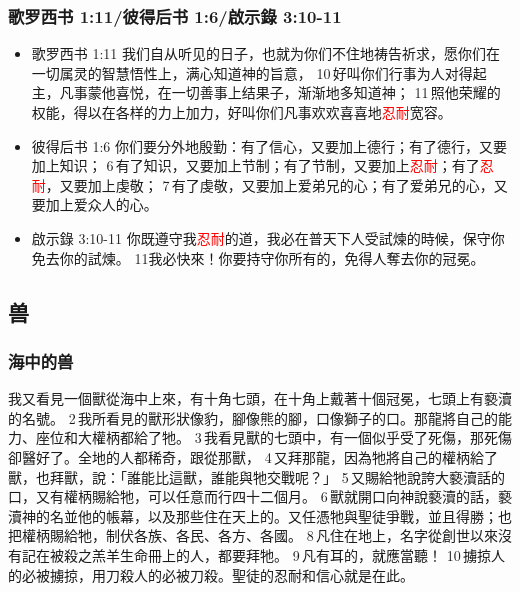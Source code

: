 \subsubsection{歌罗西书 1:11/彼得后书 1:6/啟示錄 3:10-11} 
\begin{itemize}[noitemsep]
\item 歌罗西书 1:11 我们自从听见的日子，也就为你们不住地祷告祈求，愿你们在一切属灵的智慧悟性上，满心知道神的旨意， 10 好叫你们行事为人对得起主，凡事蒙他喜悦，在一切善事上结果子，渐渐地多知道神； 11 照他荣耀的权能，得以在各样的力上加力，好叫你们凡事欢欢喜喜地\textcolor{red}{忍耐}宽容。
 
\item 彼得后书 1:6 你们要分外地殷勤：有了信心，又要加上德行；有了德行，又要加上知识； 6 有了知识，又要加上节制；有了节制，又要加上\textcolor{red}{忍耐}；有了\textcolor{red}{忍耐}，又要加上虔敬； 7 有了虔敬，又要加上爱弟兄的心；有了爱弟兄的心，又要加上爱众人的心。

\item 啟示錄 3:10-11 你既遵守我\textcolor{red}{忍耐}的道，我必在普天下人受試煉的時候，保守你免去你的試煉。 11我必快來！你要持守你所有的，免得人奪去你的冠冕。
\end{itemize}






\subsection{兽}
\subsubsection{海中的兽}

我又看見一個獸從海中上來，有十角七頭，在十角上戴著十個冠冕，七頭上有褻瀆的名號。 2 我所看見的獸形狀像豹，腳像熊的腳，口像獅子的口。那龍將自己的能力、座位和大權柄都給了牠。 3 我看見獸的七頭中，有一個似乎受了死傷，那死傷卻醫好了。全地的人都稀奇，跟從那獸， 4 又拜那龍，因為牠將自己的權柄給了獸，也拜獸，說：「誰能比這獸，誰能與牠交戰呢？」 5 又賜給牠說誇大褻瀆話的口，又有權柄賜給牠，可以任意而行四十二個月。 6 獸就開口向神說褻瀆的話，褻瀆神的名並他的帳幕，以及那些住在天上的。又任憑牠與聖徒爭戰，並且得勝；也把權柄賜給牠，制伏各族、各民、各方、各國。 8 凡住在地上，名字從創世以來沒有記在被殺之羔羊生命冊上的人，都要拜牠。 9 凡有耳的，就應當聽！ 10 擄掠人的必被擄掠，用刀殺人的必被刀殺。聖徒的忍耐和信心就是在此。

